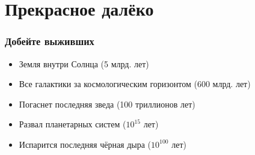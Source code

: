 \documentclass[aspectratio=169]{beamer}
\begin{document}
\section{Прекрасное далёко}
\begin{frame}
\frametitle{Добейте выживших}
\begin{itemize}
\item Земля внутри Солнца (5 млрд. лет)
\item Все галактики за космологическим горизонтом (600 млрд. лет)
\item Погаснет последняя зведа (100 триллионов лет)
\item Развал планетарных систем ($10^{15}$ лет)
\item Испарится последняя чёрная дыра ($10^{100}$ лет)
\end{itemize}
\end{frame}
\end{document}
